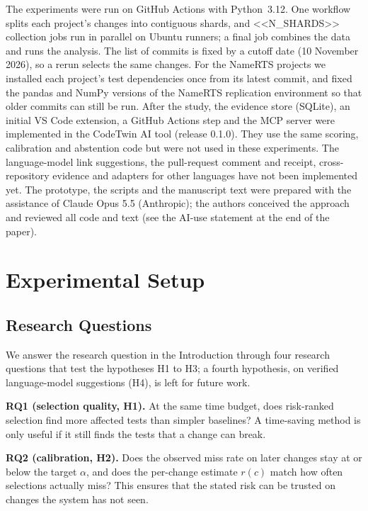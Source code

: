 \documentclass[conference]{IEEEtran}
\begin{document}
The experiments were run on GitHub Actions with Python~3.12. One workflow splits each project's changes into contiguous shards, and <<N_SHARDS>> collection jobs run in parallel on Ubuntu runners; a final job combines the data and runs the analysis. The list of commits is fixed by a cutoff date (10 November 2026), so a rerun selects the same changes. For the NameRTS projects we installed each project's test dependencies once from its latest commit, and fixed the pandas and NumPy versions of the NameRTS replication environment so that older commits can still be run. After the study, the evidence store (SQLite), an initial VS Code extension, a GitHub Actions step and the MCP server were implemented in the CodeTwin AI tool (release 0.1.0). They use the same scoring, calibration and abstention code but were not used in these experiments. The language-model link suggestions, the pull-request comment and receipt, cross-repository evidence and adapters for other languages have not been implemented yet. The prototype, the scripts and the manuscript text were prepared with the assistance of Claude Opus 5.5 (Anthropic); the authors conceived the approach and reviewed all code and text (see the AI-use statement at the end of the paper).

\section{Experimental Setup}\label{sec:setup}
\subsection{Research Questions}
We answer the research question in the Introduction through four research questions that test the hypotheses H1 to H3; a fourth hypothesis, on verified language-model suggestions (H4), is left for future work.

\textbf{RQ1 (selection quality, H1).} At the same time budget, does risk-ranked selection find more affected tests than simpler baselines? A time-saving method is only useful if it still finds the tests that a change can break.

\textbf{RQ2 (calibration, H2).} Does the observed miss rate on later changes stay at or below the target $\alpha$, and does the per-change estimate $r(c)$ match how often selections actually miss? This ensures that the stated risk can be trusted on changes the system has not seen.
\end{document}
